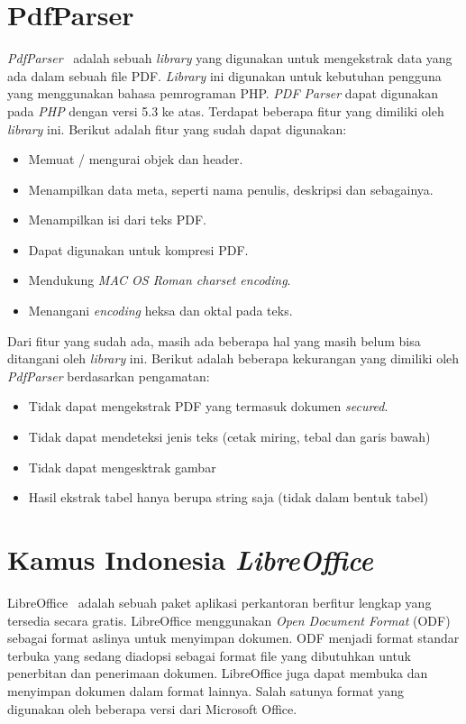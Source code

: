 \section{PdfParser}
\label{sec:pdfparser}

\textit{PdfParser}~\cite{pdfparser} adalah sebuah \textit{library} yang digunakan untuk mengekstrak data yang ada dalam sebuah file PDF. \textit{Library} ini digunakan untuk kebutuhan pengguna yang menggunakan bahasa pemrograman PHP. \textit{PDF Parser} dapat digunakan pada \textit{PHP} dengan versi 5.3 ke atas. Terdapat beberapa fitur yang dimiliki oleh \textit{library} ini. Berikut adalah fitur yang sudah dapat digunakan:

\begin{itemize}
	\item Memuat / mengurai objek dan header.
	\item Menampilkan data meta, seperti nama penulis, deskripsi dan sebagainya.
	\item Menampilkan isi dari teks PDF.
	\item Dapat digunakan untuk kompresi PDF.
	\item Mendukung \textit{MAC OS Roman charset encoding}.
	\item Menangani \textit{encoding} heksa dan oktal pada teks.
\end{itemize}

Dari fitur yang sudah ada, masih ada beberapa hal yang masih belum bisa ditangani oleh \textit{library} ini. Berikut adalah beberapa kekurangan yang dimiliki oleh \textit{PdfParser} berdasarkan pengamatan:

\begin{itemize}
	\item Tidak dapat mengekstrak PDF yang termasuk dokumen \textit{secured}.
	\item Tidak dapat mendeteksi jenis teks (cetak miring, tebal dan garis bawah)
	\item Tidak dapat mengesktrak gambar
	\item Hasil ekstrak tabel hanya berupa string saja (tidak dalam bentuk tabel)
\end{itemize}

\section{Kamus Indonesia \textit{LibreOffice}}
\label{sec:kamusindo}

LibreOffice~\cite{libreoffice} adalah sebuah paket aplikasi perkantoran berfitur lengkap yang tersedia secara gratis. LibreOffice menggunakan \textit{Open Document Format} (ODF) sebagai format aslinya untuk menyimpan dokumen. ODF menjadi format standar terbuka yang sedang diadopsi sebagai format file yang dibutuhkan untuk penerbitan dan penerimaan dokumen. LibreOffice juga dapat membuka dan menyimpan dokumen dalam format lainnya. Salah satunya format yang digunakan oleh beberapa versi dari Microsoft Office.

